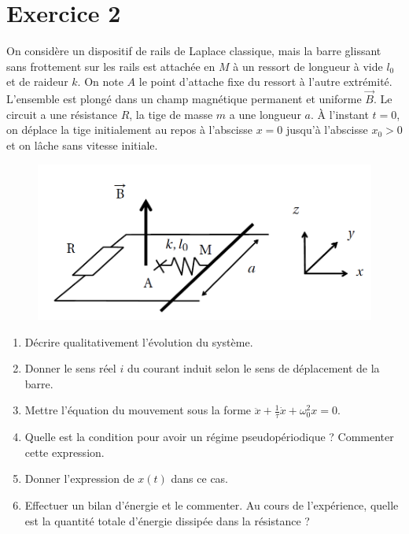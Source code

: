\documentclass[a4paper,12pt,french]{article}
\begin{document}
\newpage

\section{Exercice 2}

On considère un dispositif de rails de Laplace classique, mais la barre glissant sans frottement sur les rails est attachée en $M$ à un ressort de longueur à vide $l_0$ et de raideur $k$. On note $A$ le point d'attache fixe du ressort à l'autre extrémité. L'ensemble est plongé dans un champ magnétique permanent et uniforme $\vec{B}$. Le circuit a une résistance $R$, la tige de masse $m$ a une longueur $a$. À l'instant $t=0$, on déplace la tige initialement au repos à l'abscisse $x=0$ jusqu'à l'abscisse $x_0>0$ et on lâche sans vitesse initiale.

\begin{figure}[h]
	\centering
	\includegraphics[width=.7\textwidth]{ex_02.png}
\end{figure}

\begin{enumerate}
	\item Décrire qualitativement l'évolution du système.
	\item Donner le sens réel $i$ du courant induit selon le sens de déplacement de la barre.
	\item Mettre l'équation du mouvement sous la forme $\ddot{x}+\frac{1}{\tau}\dot{x}+\omega_0^2x = 0$.
	\item Quelle est la condition pour avoir un régime pseudopériodique ? Commenter cette expression.
	\item Donner l'expression de $x(t)$ dans ce cas.
	\item Effectuer un bilan d'énergie et le commenter. Au cours de l'expérience, quelle est la quantité totale d'énergie dissipée dans la résistance ? 
\end{enumerate}

\newpage
\end{document}
